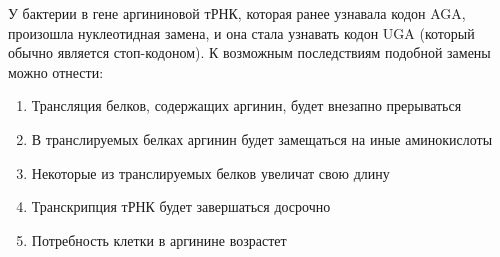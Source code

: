 
У бактерии в гене аргининовой тРНК, которая
ранее узнавала кодон AGA, произошла нуклеотидная замена, и она стала узнавать
кодон UGA (который обычно является стоп-кодоном). К возможным последствиям
подобной замены можно отнести:

\begin{enumerate}
    \item Трансляция белков, содержащих аргинин, будет внезапно прерываться 
    \item В транслируемых белках аргинин будет замещаться на иные аминокислоты 
    \item Некоторые из транслируемых белков увеличат свою длину
    \item Транскрипция тРНК будет завершаться досрочно
    \item Потребность клетки в аргинине возрастет
\end{enumerate}

\explanationSection

